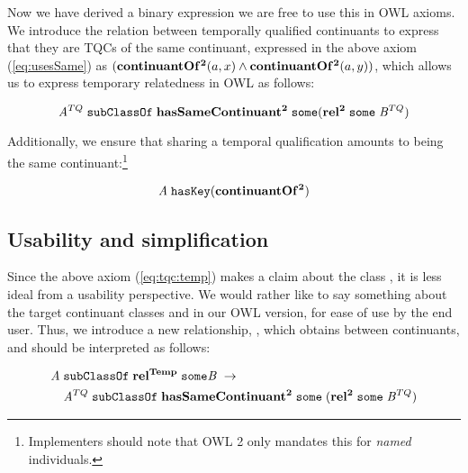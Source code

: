 Now we have derived a binary expression  we are free to use this in OWL
axioms. We introduce the relation  between temporally qualified
continuants to express that they are TQCs of the same continuant,
expressed in the above axiom (\ref{eq:usesSame}) as $(\mathrm{\mathbf{continuantOf^2}}(a,x)
\wedge \mathrm{\mathbf{continuantOf^2}}(a,y))$, which allows us to express temporary relatedness in OWL as follows:



\begin{equation}
\mathit{A}^{TQ}\;\mathtt{subClassOf}\;\mathrm{\mathbf{hasSameContinuant^2}}\;\mathtt{some
(}\mathrm{\mathbf{rel^2}}\;\mathtt{some}\;\mathit{B}^{TQ})
\label{eq:tqc:temp}
\end{equation}

Additionally, we ensure that sharing a temporal qualification amounts to being
the same continuant:\footnote{Implementers should note that OWL 2 only mandates
this for \emph{named} individuals.}

\begin{equation}
\mathit{A}\;\mathtt{hasKey}(\mathrm{\mathbf{continuantOf^2}})
\end{equation}




\subsection*{Usability and simplification}
Since the above axiom (\ref{eq:tqc:temp}) makes a claim about the class ,
it is less ideal from a usability perspective. We would rather like to say
something about the target continuant classes  and  in our OWL version, for
ease of use by the end user. Thus, we introduce a new relationship,
, which obtains between continuants, and should be interpreted as follows:


\begin{equation}
\begin{split}
\mathit{A}\;&\mathtt{subClassOf}\;\mathrm{\mathbf{rel^{Temp}}}\;\mathtt{some}\mathit{B}\;\rightarrow\\
&\mathit{A}^{TQ}\;\mathtt{subClassOf}\;\mathrm{\mathbf{hasSameContinuant^2}}\;\mathtt{some}\;(\mathrm{\mathbf{rel^2}}\;\mathtt{some}\;
\mathit{B}^{TQ})
\end{split}
\end{equation}



